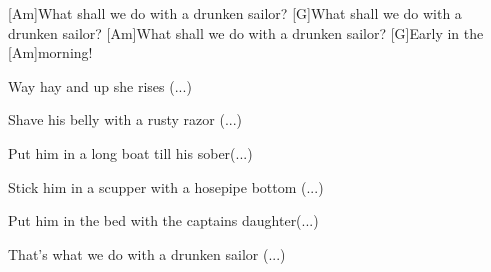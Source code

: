 


\begin{guitar}
	[Am]What shall we do with a drunken sailor?
	[G]What shall we do with a drunken sailor?
	[Am]What shall we do with a drunken sailor?
	[G]Early in the [Am]morning!
	
	Way hay and up she rises (...)
	
	Shave his belly with a rusty razor (...)
	
	Put him in a long boat till his sober(...)
	
	Stick him in a scupper with a hosepipe bottom (...)
	
	Put him in the bed with the captains daughter(...)
	
	That's what we do with a drunken sailor (...)
\end{guitar}
